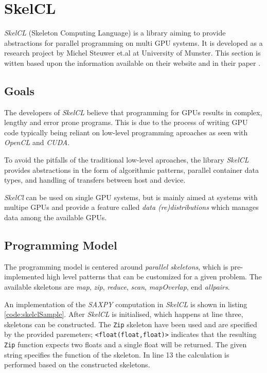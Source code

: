 \section{SkelCL}
\textit{SkelCL} (Skeleton Computing Language) is a library aiming to provide abstractions for parallel programming on multi GPU systems. It is developed as a research project by Michel Steuwer et.al at University of Munster. This section is witten based upon the information available on their website \cite{skelclWebsite} and in their paper \cite{skelclPaper}.

\subsection{Goals}
The developers of \textit{SkelCL} believe that programming for GPUs results in complex, lengthy and error prone programs. This is due to the process of writing GPU code typically being reliant on low-level programming aproaches as seen with \textit{OpenCL} and \textit{CUDA}. 

To avoid the pitfalls of the traditional low-level aproaches, the library \textit{SkelCL} provides abstractions in the form of algorithmic patterns, parallel container data types, and handling of transfers between host and device. 

\textit{SkelCl} can be used on single GPU systems, but is mainly aimed at systems with multipe GPUs and provide a feature called \textit{data (re)distributions} which manages data among the available GPUs.

\subsection{Programming Model}
The programming model is centered around \textit{parallel skeletons}, which is pre-implemented high level patterns that can be customized for a given problem. The available skeletons are \textit{map}, \textit{zip}, \textit{reduce}, \textit{scan}, \textit{mapOverlap}, end \textit{allpairs}.

An implementation of the \textit{SAXPY} computation in \textit{SkelCL} is shown in listing \ref{code:skelclSample}. After \textit{SkelCL} is initialised, which happens at line three, skeletons can be constructed. The \texttt{Zip} skeleton have been used and are specified by the provided paremeters; \texttt{<float(float,float)>} indicates that the resulting \texttt{Zip} function expects two floats and a single float will be returned. The given string specifies the function of the skeleton. In line 13 the calculation is performed based on the constructed skeletons.

